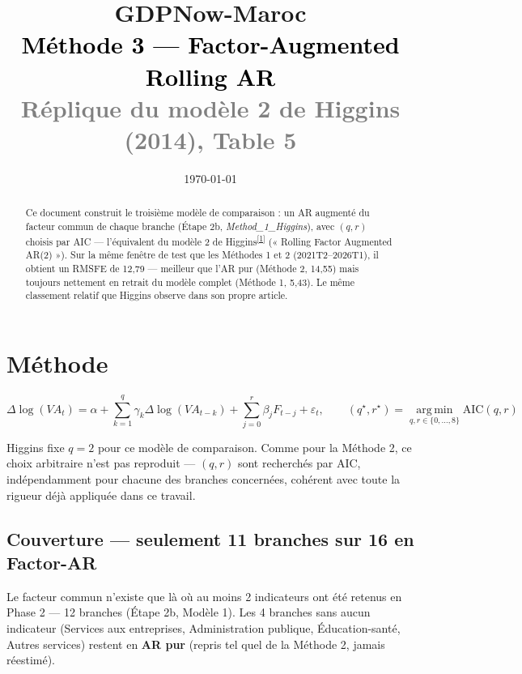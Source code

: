 \documentclass[11pt,a4paper]{article}
\title{\vspace{-1.3cm}\textcolor{bleuprincip}{\Huge\bfseries GDPNow-Maroc}\\[0.3cm]
\textcolor{black}{\Large Méthode 3 --- Factor-Augmented Rolling AR}\\[0.15cm]
\textcolor{gray}{\large Réplique du modèle 2 de Higgins (2014), Table 5}}
\author{}
\date{\today}
\newcommand{\cit}[1]{\textsuperscript{\hyperlink{ref#1}{[#1]}}}
\begin{document}
\maketitle
\thispagestyle{empty}

\begin{abstract}
\noindent Ce document construit le troisième modèle de comparaison : un AR augmenté du facteur commun de chaque branche (Étape 2b, \emph{Method\_1\_Higgins}), avec $(q,r)$ choisis par AIC --- l'équivalent du modèle 2 de Higgins\cit{1} (« Rolling Factor Augmented AR(2) »). Sur la même fenêtre de test que les Méthodes 1 et 2 (2021T2--2026T1), il obtient un RMSFE de 12,79 --- meilleur que l'AR pur (Méthode 2, 14,55) mais toujours nettement en retrait du modèle complet (Méthode 1, 5,43). Le même classement relatif que Higgins observe dans son propre article.
\end{abstract}

\tableofcontents
\vspace{0.5cm}

\section{Méthode}

\begin{equation}
\Delta\log(VA_t) = \alpha + \sum_{k=1}^{q}\gamma_k \Delta\log(VA_{t-k}) + \sum_{j=0}^{r}\beta_j F_{t-j} + \varepsilon_t,
\qquad (q^\star,r^\star) = \operatorname*{arg\,min}_{q,r\in\{0,\dots,8\}} \text{AIC}(q,r)
\end{equation}

\begin{intuition}
Higgins fixe $q=2$ pour ce modèle de comparaison. Comme pour la Méthode 2, ce choix arbitraire n'est pas reproduit --- $(q,r)$ sont recherchés par AIC, indépendamment pour chacune des branches concernées, cohérent avec toute la rigueur déjà appliquée dans ce travail.
\end{intuition}

\subsection{Couverture --- seulement 11 branches sur 16 en Factor-AR}

\begin{definitionbox}
Le facteur commun n'existe que là où au moins 2 indicateurs ont été retenus en Phase 2 --- 12 branches (Étape 2b, Modèle 1). Les 4 branches sans aucun indicateur (Services aux entreprises, Administration publique, Éducation-santé, Autres services) restent en \textbf{AR pur} (repris tel quel de la Méthode 2, jamais réestimé).
\end{definitionbox}
\end{document}
